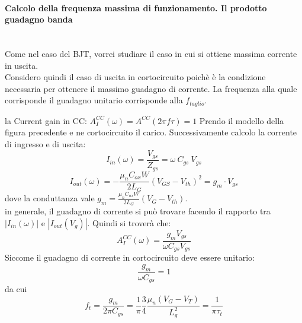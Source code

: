 \paragraph{Calcolo della frequenza massima di funzionamento. Il prodotto guadagno banda}\mbox{}\\

Come nel caso del BJT, vorrei studiare il caso in cui si ottiene massima corrente in uscita.\\
Considero quindi il caso di uscita in cortocircuito poichè è la condizione necessaria per ottenere il massimo guadagno di corrente.
La frequenza alla quale corrisponde il guadagno unitario corrisponde alla $f_{taglio}$.

la Current gain in CC:
$A_I^{CC}(\omega)=A^{CC}(2\pi f \tau)=1$
Prendo il modello della figura precedente e ne cortocircuito il carico. Successivamente calcolo la corrente di ingresso e di uscita:
%
\begin{equation}
    I_{in}(\omega)=\dfrac{V_{gs}}{Z_{gs}}=\omega\ C_{gs}\ V_{gs}
\end{equation}
%
\begin{equation}
    I_{out}(\omega)=-\frac{\mu_nC_{ox}W}{2L_G}(V_{GS}-V_{th})^2=g_m \cdot V_{gs}
\end{equation}
dove la conduttanza vale $g_m=\frac{\mu_nC_{ox}W}{2L_G}(V_{G}-V_{th})$.\\
%

in generale, il guadagno di corrente si può trovare facendo il rapporto tra $|I_{in}(\omega)|$ e $|I_{out}(V_g)|$. Quindi si troverà che:
%
\begin{equation}
    A_I^{CC}(\omega)=\dfrac{g_m V_{gs}}{\omega C_{gs} V_{gs}}
\end{equation}
%
Siccome il guadagno di corrente in cortocircuito deve essere unitario:
%
\begin{equation}
    \dfrac{g_m}{\omega C_{gs}}=1
\end{equation}
%
da cui
%
\begin{equation}
    f_t=\dfrac{g_m}{2\pi C_{gs}}=\dfrac{1}{\pi}\dfrac{3}{4}\dfrac{\mu_n (V_G-V_T)}{L_g^2} = \dfrac{1}{\pi \tau_t}
\end{equation}


